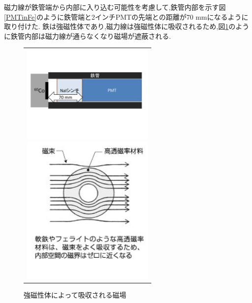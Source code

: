 磁力線が鉄管端から内部に入り込む可能性を考慮して,鉄管内部を示す図\ref{PMTinFe}のように鉄管端と2インチPMTの先端との距離が70 mmになるように取り付けた.
鉄は強磁性体であり,磁力線は強磁性体に吸収されるため,図\ref{jibakyusyu}のように鉄管内部は磁力線が通らなくなり磁場が遮蔽される.

\begin{figure}[tbp]
  \begin{center}
    \begin{tabular}{c}
      \begin{minipage}[tbp]{0.6\hsize}    
        \begin{center}
          \includegraphics[width=6.5cm]{fig/iguchi/PMTinFe.pdf}
	\caption{鉄管内部図}
	\label{PMTinFe}
     \end{center}
    \end{minipage}
      \begin{minipage}[tbp]{0.4\hsize}    
        \begin{center}
          \includegraphics[width=6.5cm]{fig/iguchi/jibakyusyu.jpg}
         \caption{強磁性体によって吸収される磁場\cite{jibashield}}
	  \label{jibakyusyu}
         \end{center}
        \end{minipage}
     
     \end{tabular}
      \end{center}
   \end{figure}
   



